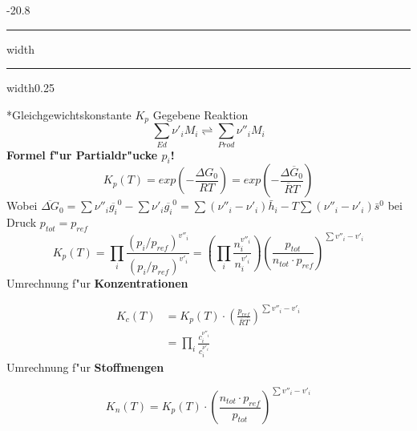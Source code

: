 \documentclass[8pt, landscape, fleqn]{scrartcl}
\makeatletter
\renewcommand{\subsection}{\@startsection{subsection}{1}{0mm}%
{-2\baselineskip}{0.8\baselineskip}%
{\hrule depth 0.2pt width\columnwidth\hrule depth0.75pt
width0.25\columnwidth\vspace*{1.2em}\large\bfseries\rmfamily}}
\makeatother
\begin{document}
\begin{multicols*}{3}
\subsection*{Gleichgewichtskonstante $K_p$}
Gegebene Reaktion
\begin{equation}
\sum_{Ed} \nu'_i M_i \rightleftharpoons \sum_{Prod} \nu''_i M_i
\end{equation}
{\bf{Formel f"ur Partialdr"ucke $p_i$!}}
\begin{equation}
K_p(T) = exp \left(-\frac{\Delta G_0}{RT} \right) = exp \left(-\frac{\Delta \overline{G}_0}{\overline{R} T} \right)
\end{equation}
Wobei $\overline{\Delta G}_0 = \sum \nu''_i \overline{g_i}^0 - \sum \nu'_i \overline{g_i}^0 = \sum (\nu''_i-\nu'_i) \bar{h}_i - T \sum (\nu''_i -\nu'_i) \bar{s}^0$ bei Druck $p_{tot}=p_{ref}$
\begin{equation}
K_p(T) = \prod_i \frac{(p_i/p_{ref})^{v''_i}}{(p_i/p_{ref})^{v'_i}} = \left( \prod_i \frac{n_i^{v''_i}}{n_i^{v'_i}}\right) \left( \frac{p_{tot}}{n_{tot} \cdot p_{ref}} \right)^{\sum v''_i - v'_i}
\end{equation}
Umrechnung f"ur {\bf{Konzentrationen}}



\begin{equation}
\begin{split}
K_c(T) &= K_p(T) \cdot \left( \frac{p_{ref}}{\overline{R}T} \right) ^{\sum v''_i-v'_i} \\\ 
&= \prod_i \frac{c_i^{\nu''_i}}{c_i^{\nu'_i}}
\end{split}
\end{equation}
Umrechnung f"ur {\bf{Stoffmengen}}



\begin{equation}
K_n(T) = K_p(T) \cdot \left( \frac{n_{tot}\cdot p_{ref}}{p_{tot}} \right) ^{\sum v''_i-v'_i}
\end{equation}


\end{multicols*}
\end{document}
